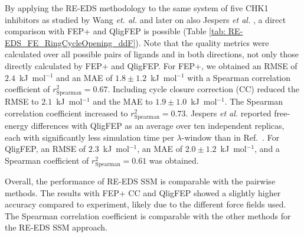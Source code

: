 By applying the RE-EDS methodology to the same system of five CHK1 inhibitors as studied by Wang \textit{et. al.} \cite{Wang2017} and later on also Jespers \textit{et al.} \cite{Jespers2019}, a direct comparison with FEP+ and QligFEP is possible (Table \ref{tab: RE-EDS_FE_RingCycleOpening_ddF}). Note that the quality metrics were calculated over all possible pairs of ligands and in both directions, not only those directly calculated by FEP+ and QligFEP.
For FEP+, we obtained an RMSE of $2.4$~kJ~mol$^{-1}$ and an MAE of $1.8 \pm 1.2$~kJ~mol$^{-1}$ with a Spearman correlation coefficient of $r^2_{\text{Spearman}}=0.67$.
Including cycle closure correction (CC) \cite{Wang2017} reduced the RMSE to $2.1$~kJ~mol$^{-1}$ and the MAE to $1.9 \pm 1.0$~kJ~mol$^{-1}$. The Spearman correlation coefficient increased to $r^2_{\text{Spearman}}=0.73$.
Jespers \textit{et al.} \cite{Jespers2019} reported free-energy differences with QligFEP as an average over ten independent replicas, each with significantly less simulation time per $\lambda$-window than in Ref.~\cite{Wang2017}. For QligFEP, an RMSE of $2.3$~kJ~mol$^{-1}$, an MAE of $2.0 \pm 1.2$~kJ~mol$^{-1}$, and a Spearman coefficient of $r^2_{\text{Spearman}}=0.61$ was obtained.

Overall, the performance of RE-EDS SSM is comparable with the pairwise methods. The results with FEP+ CC and QligFEP showed a slightly higher accuracy compared to experiment, likely due to the different force fields used. The Spearman correlation coefficient is comparable with the other methods for the RE-EDS SSM approach.

